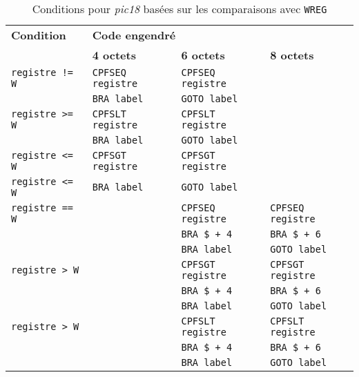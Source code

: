 \begin{table}[!ht]
  \centering
  \small
  \begin{tabular}{llll}
    \textbf{Condition} & \multicolumn{3}{l}{\bf Code engendré}\\
                       & \textbf{4 octets} & \textbf{6 octets} & \textbf{8 octets}\\
    \hline
                           \texttt{registre != W} &\texttt{CPFSEQ registre}  & \texttt{CPFSEQ registre}  &  \\
                                                  &\texttt{BRA label}        & \texttt{GOTO label}  &  \\
    \rowcolor{\fondTableau}\texttt{registre >= W} &\texttt{CPFSLT registre}  & \texttt{CPFSLT registre}  &  \\
    \rowcolor{\fondTableau}                       &\texttt{BRA label}        & \texttt{GOTO label}  &  \\
                           \texttt{registre <= W} &\texttt{CPFSGT registre}  & \texttt{CPFSGT registre}  &  \\
                           \texttt{registre <= W} &\texttt{BRA label}        & \texttt{GOTO label}  &  \\
    \rowcolor{\fondTableau}\texttt{registre == W} & &\texttt{CPFSEQ registre}  & \texttt{CPFSEQ registre}  \\
    \rowcolor{\fondTableau}                       & &\texttt{BRA \$ + 4}       & \texttt{BRA \$ + 6}  \\
    \rowcolor{\fondTableau}                       & &\texttt{BRA label}        & \texttt{GOTO label}  \\
                           \texttt{registre > W}  & &\texttt{CPFSGT registre}  & \texttt{CPFSGT registre}  \\
                                                  & &\texttt{BRA \$ + 4}       & \texttt{BRA \$ + 6}  \\
                                                  & &\texttt{BRA label}        & \texttt{GOTO label}  \\
    \rowcolor{\fondTableau}\texttt{registre > W}  & &\texttt{CPFSLT registre}  & \texttt{CPFSLT registre}  \\
    \rowcolor{\fondTableau}                       & &\texttt{BRA \$ + 4}       & \texttt{BRA \$ + 6}  \\
    \rowcolor{\fondTableau}                       & &\texttt{BRA label}        & \texttt{GOTO label}  \\
    \hline
  \end{tabular}
  \caption{Conditions pour \emph{pic18} basées sur les comparaisons avec \texttt{WREG}}
\end{table}

